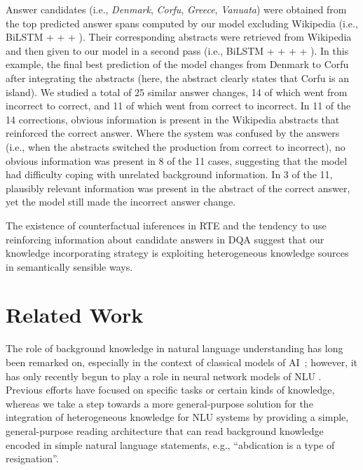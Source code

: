 \documentclass[11pt,a4paper]{article}
\begin{document}
\noindent Answer candidates (i.e., \textit{Denmark}, \textit{Corfu}, \textit{Greece}, \textit{Vanuata}) were obtained from the top predicted answer spans computed by our model excluding Wikipedia (i.e., BiLSTM +  +  + ). Their corresponding abstracts were retrieved from Wikipedia and then given to our model in a second pass (i.e., BiLSTM +  +  +  + ). In this example, the final best prediction of the model changes from Denmark to Corfu after integrating the abstracts (here, the abstract clearly states that Corfu is an island). We studied a total of 25 similar answer changes, 14 of which went from incorrect to correct, and 11 of which went from correct to incorrect. In 11 of the 14 corrections, obvious information is present in the Wikipedia abstracts that reinforced the correct answer. Where the system was confused by the answers (i.e., when the abstracts switched the production from correct to incorrect), no obvious information was present in 8 of the 11 cases, suggesting that the model had difficulty coping with unrelated background information. In 3 of the 11, plausibly relevant information was present in the abstract of the correct answer, yet the model still made the incorrect answer change.

The existence of counterfactual inferences in RTE and the tendency to use reinforcing information about candidate answers in DQA suggest that our knowledge incorporating strategy is exploiting heterogeneous knowledge sources in semantically sensible ways.

\section{Related Work}
The role of background knowledge in natural language understanding has long been remarked on, especially in the context of classical models of AI~\citep{schank:1977,minsky2000commonsense}; however, it has only recently begun to play a role in neural network models of NLU \citep{ahn2016neural,Xu2016,long2017world,Dhingra2017}. Previous efforts have focused on specific tasks or certain kinds of knowledge, whereas we take a step towards a more general-purpose solution for the integration of heterogeneous knowledge for NLU systems by providing a simple, general-purpose reading architecture that can read background knowledge encoded in simple natural language statements, e.g., ``abdication is a type of resignation''.
\end{document}
